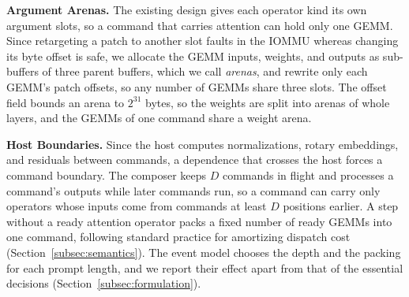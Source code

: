 \textbf{Argument Arenas.}
The existing design gives each operator kind its own argument slots, so a command that carries attention can hold only one GEMM.
Since retargeting a patch to another slot faults in the IOMMU whereas changing its byte offset is safe, we allocate the GEMM inputs, weights, and outputs as sub-buffers of three parent buffers, which we call \emph{arenas}, and rewrite only each GEMM's patch offsets, so any number of GEMMs share three slots.
The offset field bounds an arena to $2^{31}$ bytes, so the weights are split into arenas of whole layers, and the GEMMs of one command share a weight arena.

\textbf{Host Boundaries.}
Since the host computes normalizations, rotary embeddings, and residuals between commands, a dependence that crosses the host forces a command boundary.
The composer keeps $D$ commands in flight and processes a command's outputs while later commands run, so a command can carry only operators whose inputs come from commands at least $D$ positions earlier.
A step without a ready attention operator packs a fixed number of ready GEMMs into one command, following standard practice for amortizing dispatch cost (Section~\ref{subsec:semantics}).
The event model chooses the depth and the packing for each prompt length, and we report their effect apart from that of the essential decisions (Section~\ref{subsec:formulation}).

